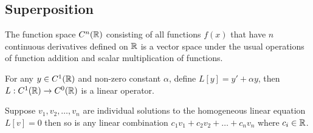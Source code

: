 \documentclass[class=article,crop=false]{standalone}
\begin{document}
\subsection{Superposition}
\begin{eg}
	The function space $C^n(\mathbb{R})$ consisting of all functions $f(x)$ that have  $n$ continuous derivatives defined on  $\mathbb{R}$ is a vector space under the usual operations of function addition and scalar multiplication of functions.
\end{eg}

\begin{eg}[]
	For any $y \in C^1(\mathbb{R})$ and non-zero constant $\alpha$, define $L[y]=y'+\alpha y$, then $L: C^1(\mathbb{R}) \to C^0(\mathbb{R})$ is a linear operator.
\end{eg}
\begin{thm}
	Suppose $v_1,v_2,\ldots,v_n$ are individual solutions to the homogeneous linear equation $L[v]=0$ then so is any linear combination  $c_1 v_1+c_2v_2+\ldots+c_n v_n$ where $c_i \in \mathbb{R}$.
\end{thm}
\end{document}
